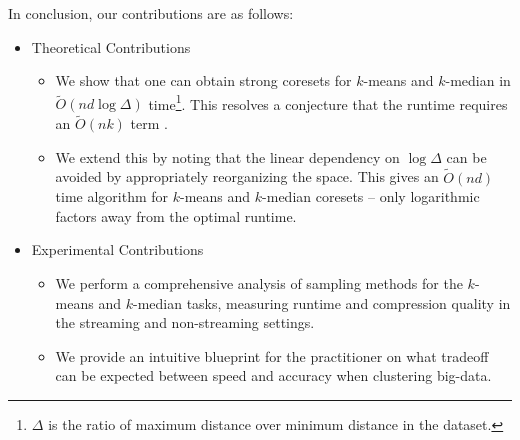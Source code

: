 In conclusion, our contributions are as follows:
\begin{itemize}
    \item Theoretical Contributions
    \begin{itemize}
        \item We show that one can obtain strong coresets for $k$-means and $k$-median in $\tilde{O}(nd \log \Delta)$ time\footnote{$\Delta$ is the ratio of maximum distance over minimum
distance in the dataset.}. This resolves a conjecture that the runtime requires an $\tilde{O}(nk)$ term \cite{DSWY22}.
        \item We extend this by noting that the linear dependency on $\log \Delta$ can be avoided by appropriately reorganizing the space. This gives an $\tilde{O}(nd)$
time algorithm for $k$-means and $k$-median coresets -- only logarithmic factors away from the optimal runtime.
    \end{itemize}
    \item Experimental Contributions
    \begin{itemize}
        \item We perform a comprehensive analysis of sampling methods for the $k$-means and $k$-median tasks, measuring runtime and compression quality in
the streaming and non-streaming settings.
        \item We provide an intuitive blueprint for the practitioner on what tradeoff can be expected between speed and accuracy when clustering big-data.
    \end{itemize}
\end{itemize}

